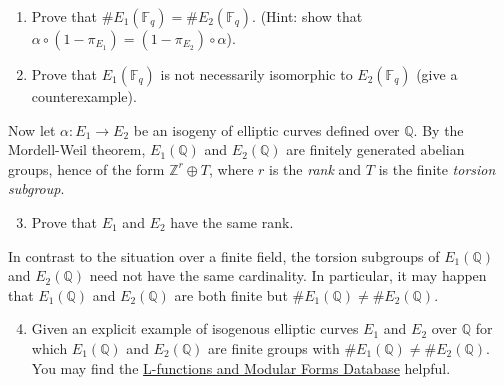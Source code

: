\documentclass[11pt]{article}
\newcommand{\Fq}{\mathbb{F}_q}
\newcommand{\Q}{\mathbb{Q}}
\newcommand{\Z}{\mathbb{Z}}
\begin{document}
\begin{enumerate}[{\bf (a)}]
\item Prove that $\#E_1(\Fq)=\#E_2(\Fq)$. (Hint: show that $\alpha\circ (1-\pi_{E_1})=(1-\pi_{E_2})\circ\alpha$).
\item Prove that $E_1(\Fq)$ is not necessarily isomorphic to $E_2(\Fq)$ (give a counterexample).
\end{enumerate}
Now let $\alpha\colon E_1\to E_2$ be an isogeny of elliptic curves defined over $\Q$.
By the Mordell-Weil theorem, $E_1(\Q)$ and $E_2(\Q)$ are finitely generated abelian groups, hence of the form $\Z^r\oplus T$, where $r$ is the \emph{rank} and $T$ is the finite \emph{torsion subgroup}.

\begin{enumerate}[{\bf (a)}]
\setcounter{enumi}{2}
\item Prove that $E_1$ and $E_2$ have the same rank.
\end{enumerate}
In contrast to the situation over a finite field, the torsion subgroups of $E_1(\Q)$ and $E_2(\Q)$ need not have the same cardinality.
In particular, it may happen that $E_1(\Q)$ and $E_2(\Q)$ are both finite but $\#E_1(\Q)\ne \#E_2(\Q)$.
\begin{enumerate}[{\bf (a)}]
\setcounter{enumi}{3}
\item Given an explicit example of isogenous elliptic curves $E_1$ and $E_2$ over $\Q$ for which $E_1(\Q)$ and $E_2(\Q)$ are finite groups with  $\#E_1(\Q)\ne \#E_2(\Q)$.
You may find the \href{http://lmfdb.org}{L-functions and Modular Forms Database} helpful.
\end{enumerate}
\end{document}
